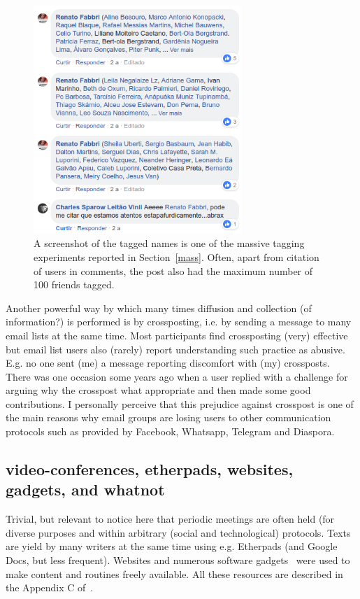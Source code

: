 \documentclass[a4paper]{article}
\begin{document}
\begin{figure}[H]
  \centering
    \includegraphics[width=0.7\textwidth]{Screenshot}
  \caption{A screenshot of the tagged names is one of the massive tagging experiments reported in Section~\ref{mass}. Often, apart from citation of users in comments, the post also had the maximum number of 100 friends tagged.}\label{massive}
\end{figure}

Another powerful way by which many times diffusion and collection (of information?) is performed
is by crossposting, i.e. by sending a message to many email lists
at the same time.
Most participants find crossposting (very) effective but email list users also (rarely) report understanding such practice as abusive.
E.g. no one sent (me) a message reporting discomfort with (my) crossposts.
There was one occasion some years ago when a user replied with a challenge for
arguing why the crosspost what appropriate and then made some good contributions.
I personally perceive that this prejudice against crosspost is one of the main reasons
why email groups are losing users to other communication protocols such as provided by
Facebook, Whatsapp, Telegram and Diaspora.

\subsection{video-conferences, etherpads, websites, gadgets, and whatnot}\label{video}
Trivial, but relevant to notice here that periodic meetings are often held
(for diverse purposes and within arbitrary (social and technological) protocols.
Texts are yield by many writers at the same time using e.g. Etherpads (and Google Docs, but less frequent).
Websites and numerous software gadgets~\cite{ttmRepos} were used to make content and routines
freely available. All these resources are described in the Appendix C of~\cite{thesis}.
      
\end{document}
